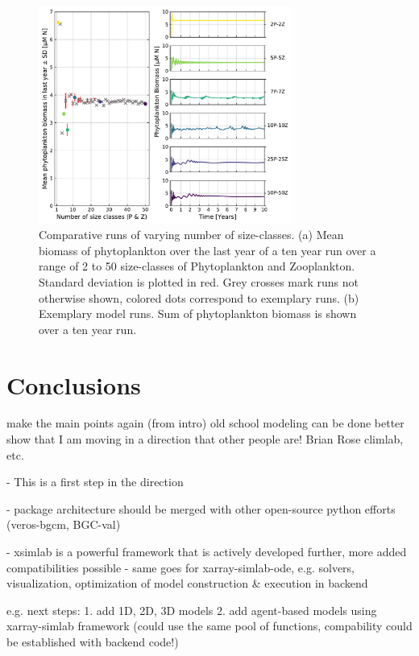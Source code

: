 \documentclass[journal abbreviation, manuscript]{copernicus}
\begin{document}
\begin{figure}[t]
\includegraphics[width=8.3cm]{Figures/firstdraft_plots/03_ASTroCAT_sizeclassrange.pdf}
\caption{Comparative runs of varying number of size-classes. (a) Mean biomass of phytoplankton over the last year of a ten year run over a range of 2 to 50 size-classes of Phytoplankton and Zooplankton. Standard deviation is plotted in red. Grey crosses mark runs not otherwise shown, colored dots correspond to exemplary runs. (b) Exemplary model runs. Sum of phytoplankton biomass is shown over a ten year run.}
\label{Figure:ResultsASTroCAT_2}
\end{figure}


\section{Conclusions}

make the main points again (from intro)
old school modeling can be done better
show that I am moving in a direction that other people are! Brian Rose climlab, etc.

- This is a first step in the direction

- package architecture should be merged with other open-source python efforts (veros-bgcm, BGC-val)

- xsimlab is a powerful framework that is actively developed further, more added compatibilities possible
- same goes for xarray-simlab-ode, e.g. solvers, visualization, optimization of model construction \& execution in backend

e.g. next steps: 1. add 1D, 2D, 3D models 2. add agent-based models using xarray-simlab framework (could use the same pool of functions, compability could be established with backend code!)
\end{document}
